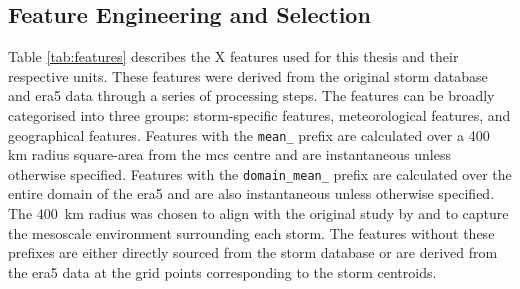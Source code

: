 \subsection{Feature Engineering and Selection}

Table \ref{tab:features} describes the X features used for this thesis and their respective units. These features were derived from the original storm database and \acrshort{era5} data through a series of processing steps. The features can be broadly categorised into three groups: storm-specific features, meteorological features, and geographical features. Features with the \texttt{mean\_} prefix are calculated over a 400 km radius square-area from the \acrshort{mcs} centre and are instantaneous unless otherwise specified. Features with the \texttt{domain\_mean\_} prefix are calculated over the entire domain of the \acrshort{era5} and are also instantaneous unless otherwise specified. The \SI{400}{\km} radius was chosen to align with the original study by \cite{Hunt2024} and to capture the mesoscale environment surrounding each storm. The features without these prefixes are either directly sourced from the storm database or are derived from the \acrshort{era5} data at the grid points corresponding to the storm centroids.

